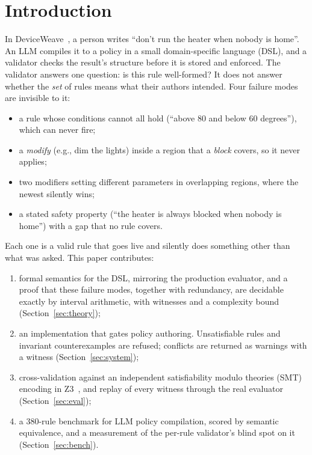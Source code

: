 \documentclass[conference]{IEEEtran}
\theoremstyle{definition}
\begin{document}
\section{Introduction}
In DeviceWeave~\cite{prior-device}, a person writes ``don't run the heater when nobody is home''. An LLM compiles it to a policy in a small domain-specific language (DSL), and a validator checks the result's structure before it is stored and enforced. The validator answers one question: is this rule well-formed? It does not answer whether the \emph{set} of rules means what their authors intended. Four failure modes are invisible to it:
\begin{itemize}
\item a rule whose conditions cannot all hold (``above 80 and below 60 degrees''), which can never fire;
\item a \emph{modify} (e.g., dim the lights) inside a region that a \emph{block} covers, so it never applies;
\item two modifiers setting different parameters in overlapping regions, where the newest silently wins;
\item a stated safety property (``the heater is always blocked when nobody is home'') with a gap that no rule covers.
\end{itemize}
Each one is a valid rule that goes live and silently does something other than what was asked. This paper contributes:
\begin{enumerate}
\item formal semantics for the DSL, mirroring the production evaluator, and a proof that these failure modes, together with redundancy, are decidable exactly by interval arithmetic, with witnesses and a complexity bound (Section~\ref{sec:theory});
\item an implementation that gates policy authoring. Unsatisfiable rules and invariant counterexamples are refused; conflicts are returned as warnings with a witness (Section~\ref{sec:system});
\item cross-validation against an independent satisfiability modulo theories (SMT) encoding in Z3~\cite{demoura2008}, and replay of every witness through the real evaluator (Section~\ref{sec:eval});
\item a 380-rule benchmark for LLM policy compilation, scored by semantic equivalence, and a measurement of the per-rule validator's blind spot on it (Section~\ref{sec:bench}).
\end{enumerate}
\end{document}
